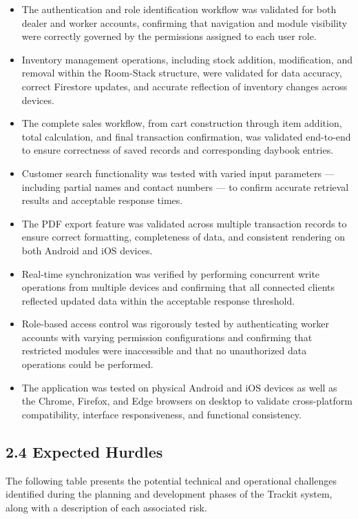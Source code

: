 \documentclass[12pt, oneside]{article}
\begin{document}
\begin{itemize}
    \item The authentication and role identification workflow was validated for both dealer and worker accounts, confirming that navigation and module visibility were correctly governed by the permissions assigned to each user role.
    \item Inventory management operations, including stock addition, modification, and removal within the Room-Stack structure, were validated for data accuracy, correct Firestore updates, and accurate reflection of inventory changes across devices.
    \item The complete sales workflow, from cart construction through item addition, total calculation, and final transaction confirmation, was validated end-to-end to ensure correctness of saved records and corresponding daybook entries.
    \item Customer search functionality was tested with varied input parameters — including partial names and contact numbers — to confirm accurate retrieval results and acceptable response times.
    \item The PDF export feature was validated across multiple transaction records to ensure correct formatting, completeness of data, and consistent rendering on both Android and iOS devices.
    \item Real-time synchronization was verified by performing concurrent write operations from multiple devices and confirming that all connected clients reflected updated data within the acceptable response threshold.
    \item Role-based access control was rigorously tested by authenticating worker accounts with varying permission configurations and confirming that restricted modules were inaccessible and that no unauthorized data operations could be performed.
    \item The application was tested on physical Android and iOS devices as well as the Chrome, Firefox, and Edge browsers on desktop to validate cross-platform compatibility, interface responsiveness, and functional consistency.
\end{itemize}

\subsection*{2.4 Expected Hurdles}

The following table presents the potential technical and operational challenges identified during the planning and development phases of the Trackit system, along with a description of each associated risk.
\end{document}
